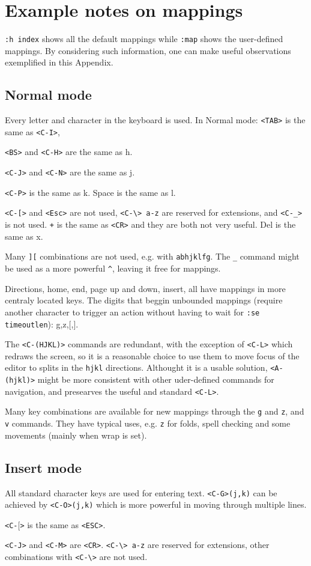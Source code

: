 \documentclass{article}
\newcommand{\ttt}[1] {
	\texttt{<#1>}}
\newcommand{\tttt}[1]{\texttt{#1}}
\begin{document}
\section{Example notes on mappings}\label{notes}
\texttt{:h index} shows all the default mappings
while \tttt{:map} shows the user-defined mappings.
By considering such information, one can make
useful observations exemplified in this Appendix.

\subsection{Normal mode}
Every letter and character in the keyboard is used.
In Normal mode: \ttt{TAB} is the same as \ttt{C-I},
\ttt{BS} and \ttt{C-H} are the same as h.
\ttt{C-J} and \ttt{C-N} are the same as j.
\ttt{C-P} is the same as k.
Space is the same as l.
\ttt{C-[} and \ttt{Esc} are not used,
\tttt{<C-\textbackslash> a-z} are reserved for extensions,
and \ttt{C-\_} is not used.
\tttt{+} is the same as \ttt{CR} and they are both not very useful.
Del is the same as x.

Many \tttt{][} combinations are not used, e.g.
with \tttt{abhjklfg}.
The \tttt{\_} command might be used as a more powerful \tttt{\^},
leaving it free for mappings.

Directions, home, end, page up and down, insert, all have mappings
in more centraly located keys.
The digits that beggin unbounded mappings (require another character to
trigger an action without having to wait for \tttt{:se timeoutlen}): g,z,[,].

The \ttt{C-(HJKL)} commands are redundant,
with the exception of \ttt{C-L} which redraws the screen,
so it is a reasonable choice to use them to move focus
of the editor to splits in the \tttt{hjkl} directions.
Althought it is a usable solution, \ttt{A-(hjkl)} might
be more consistent with other uder-defined commands for navigation,
and presearves the useful and standard \ttt{C-L}.

Many key combinations are available for new mappings through the \tttt{g}
and \tttt{z}, and \tttt{v} commands.
They have typical uses, e.g. \tttt{z} for folds,
spell checking and some movements (mainly when wrap is set).

\subsection{Insert mode}
All standard character keys are used for entering text.
\tttt{<C-G>(j,k)} can be achieved by \tttt{<C-O>(j,k)} which is more powerful
in moving through multiple lines.
\ttt{C-$[$} is the same as \ttt{ESC}.
\ttt{C-J} and \ttt{C-M} are \ttt{CR}.
\tttt{<C-\textbackslash> a-z} are reserved for extensions,
other combinations with \ttt{C-\textbackslash} are not used.
\end{document}
